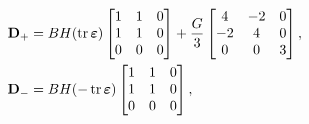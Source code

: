 \[\begin{aligned}
\mathbf{D}_+ &= BH(\operatorname{tr}\bm{\varepsilon}) \begin{bmatrix}
1 & 1 & 0 \\
1 & 1 & 0 \\
0 & 0 & 0 
\end{bmatrix} + \frac{G}3 \begin{bmatrix}
4 & -2 & 0 \\
-2 & 4 & 0 \\
0 & 0 & 3 
\end{bmatrix} ,\\
\mathbf{D}_- &= BH(-\operatorname{tr}\bm{\varepsilon}) \begin{bmatrix}
1 & 1 & 0 \\
1 & 1 & 0 \\
0 & 0 & 0 
\end{bmatrix},
\end{aligned}\]


